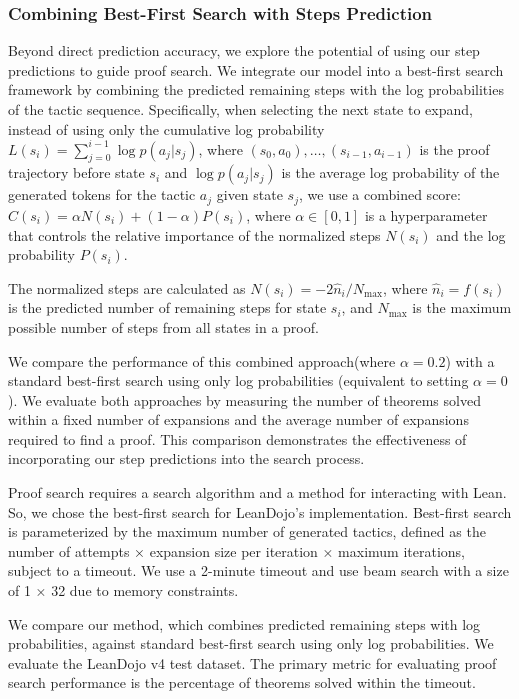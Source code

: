 \subsubsection{Combining Best-First Search with Steps Prediction}

Beyond direct prediction accuracy, we explore the potential of using our step predictions to guide proof search. We integrate our model into a best-first search framework by combining the predicted remaining steps with the log probabilities of the tactic sequence. Specifically, when selecting the next state to expand, instead of using only the cumulative log probability $L(s_i) = \sum_{j=0}^{i-1} \log p(a_j | s_j)$, where $(s_0, a_0), \dots, (s_{i-1}, a_{i-1})$ is the proof trajectory before state $s_i$ and $\log p(a_j | s_j)$ is the average log probability of the generated tokens for the tactic $a_j$ given state $s_j$, we use a combined score: $C(s_i) = \alpha N(s_i) + (1 - \alpha) P(s_i)$, where $\alpha \in [0, 1]$ is a hyperparameter that controls the relative importance of the normalized steps $N(s_i)$ and the log probability $P(s_i)$.

The normalized steps are calculated as $N(s_i) = -2\hat{n}_i / N_{\max}$, where $\hat{n}_i = f(s_i)$ is the predicted number of remaining steps for state $s_i$, and $N_{\max}$ is the maximum possible number of steps from all states in a proof.

We compare the performance of this combined approach(where $\alpha = 0.2$) with a standard best-first search using only log probabilities (equivalent to setting $\alpha = 0$). We evaluate both approaches by measuring the number of theorems solved within a fixed number of expansions and the average number of expansions required to find a proof. This comparison demonstrates the effectiveness of incorporating our step predictions into the search process.


Proof search requires a search algorithm and a method for interacting with Lean. So, we chose the best-first search for LeanDojo's implementation. Best-first search is parameterized by the maximum number of generated tactics, defined as the number of attempts × expansion size per iteration × maximum iterations, subject to a timeout. We use a 2-minute timeout and use beam search with a size of 1 × 32 due to memory constraints.


We compare our method, which combines predicted remaining steps with log probabilities, against standard best-first search using only log probabilities. We evaluate the LeanDojo v4 test dataset. The primary metric for evaluating proof search performance is the percentage of theorems solved within the timeout.

